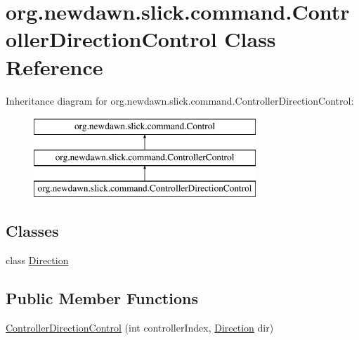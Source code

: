 \hypertarget{classorg_1_1newdawn_1_1slick_1_1command_1_1_controller_direction_control}{}\section{org.\+newdawn.\+slick.\+command.\+Controller\+Direction\+Control Class Reference}
\label{classorg_1_1newdawn_1_1slick_1_1command_1_1_controller_direction_control}
Inheritance diagram for org.\+newdawn.\+slick.\+command.\+Controller\+Direction\+Control\+:\begin{figure}[H]
\begin{center}
\leavevmode
\includegraphics[height=3.000000cm]{classorg_1_1newdawn_1_1slick_1_1command_1_1_controller_direction_control}
\end{center}
\end{figure}
\subsection*{Classes}
\begin{DoxyCompactItemize}
\item 
class \mbox{\hyperlink{classorg_1_1newdawn_1_1slick_1_1command_1_1_controller_direction_control_1_1_direction}{Direction}}
\end{DoxyCompactItemize}
\subsection*{Public Member Functions}
\begin{DoxyCompactItemize}
\item 
\mbox{\hyperlink{classorg_1_1newdawn_1_1slick_1_1command_1_1_controller_direction_control_acff75723de333500eccdd3b0bf023ac8}{Controller\+Direction\+Control}} (int controller\+Index, \mbox{\hyperlink{classorg_1_1newdawn_1_1slick_1_1command_1_1_controller_direction_control_1_1_direction}{Direction}} dir)
\end{DoxyCompactItemize}

